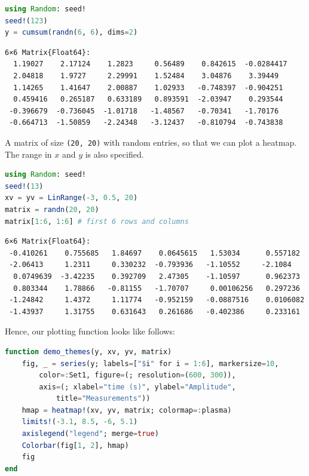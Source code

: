 \documentclass[
  notoc %
]{tufte-book}
\newcommand{\passthrough}[1]{#1}
\begin{document}
\begin{lstlisting}[language=Julia]
using Random: seed!
seed!(123)
y = cumsum(randn(6, 6), dims=2)
\end{lstlisting}

\begin{lstlisting}[language=Output]
6×6 Matrix{Float64}:
  1.19027    2.17124    1.2823     0.56489    0.842615  -0.0284417
  2.04818    1.9727     2.29991    1.52484    3.04876    3.39449
  1.14265    1.41647    2.00887    1.02933   -0.748397  -0.904251
  0.459416   0.265187   0.633189   0.893591  -2.03947    0.293544
 -0.396679  -0.736045  -1.01718   -1.48567   -0.70341   -1.70176
 -0.664713  -1.50859   -2.24348   -3.12437   -0.810794  -0.743838
\end{lstlisting}

A matrix of size \passthrough{\lstinline!(20, 20)!} with random entries,
so that we can plot a heatmap. The range in \(x\) and \(y\) is also
specified.

\begin{lstlisting}[language=Julia]
using Random: seed!
seed!(13)
xv = yv = LinRange(-3, 0.5, 20)
matrix = randn(20, 20)
matrix[1:6, 1:6] # first 6 rows and columns
\end{lstlisting}

\begin{lstlisting}[language=Output]
6×6 Matrix{Float64}:
 -0.410261    0.755685   1.84697    0.0645615   1.53034      0.557182
 -2.06413     1.2311     0.330232  -0.793936   -1.10552     -2.1084
  0.0749639  -3.42235    0.392709   2.47305    -1.10597      0.962373
  0.803344    1.78866   -0.81155   -1.70707     0.00106256   0.297236
 -1.24842     1.4372     1.11774   -0.952159   -0.0887516    0.0106082
 -1.43937     1.31755    0.631643   0.261686   -0.402386     0.233161
\end{lstlisting}

Hence, our plotting function looks like follows:

\begin{lstlisting}[language=Julia]
function demo_themes(y, xv, yv, matrix)
    fig, _ = series(y; labels=["$i" for i = 1:6], markersize=10,
        color=:Set1, figure=(; resolution=(600, 300)),
        axis=(; xlabel="time (s)", ylabel="Amplitude",
            title="Measurements"))
    hmap = heatmap!(xv, yv, matrix; colormap=:plasma)
    limits!(-3.1, 8.5, -6, 5.1)
    axislegend("legend"; merge=true)
    Colorbar(fig[1, 2], hmap)
    fig
end
\end{lstlisting}
\end{document}
